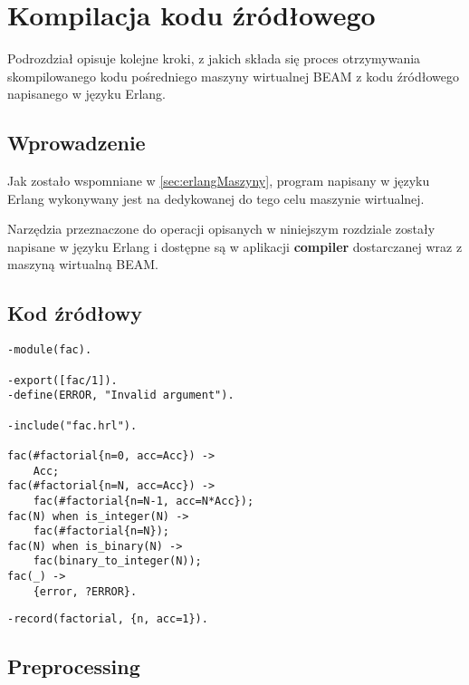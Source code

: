 \chapter{Kompilacja kodu źródłowego}
\label{cha:erlangKompilacja}

Podrozdział opisuje kolejne kroki, z jakich składa się proces otrzymywania skompilowanego kodu pośredniego maszyny wirtualnej BEAM z kodu źródłowego napisanego w języku Erlang.

\section{Wprowadzenie}

Jak zostało wspomniane w \ref{sec:erlangMaszyny}, program napisany w języku Erlang wykonywany jest na dedykowanej do tego celu maszynie wirtualnej.

Narzędzia przeznaczone do operacji opisanych w niniejszym rozdziale zostały napisane w języku Erlang i dostępne są w aplikacji \textbf{compiler} dostarczanej wraz z maszyną wirtualną BEAM.
\section{Kod źródłowy}

\begin{lstlisting}[style=erlang, caption=Plik fac.erl, label=facERL]
-module(fac).

-export([fac/1]).
-define(ERROR, "Invalid argument").

-include("fac.hrl").

fac(#factorial{n=0, acc=Acc}) ->
    Acc;
fac(#factorial{n=N, acc=Acc}) ->
    fac(#factorial{n=N-1, acc=N*Acc});
fac(N) when is_integer(N) ->
    fac(#factorial{n=N});
fac(N) when is_binary(N) ->
    fac(binary_to_integer(N));
fac(_) ->
    {error, ?ERROR}.
\end{lstlisting}

\begin{lstlisting}[style=erlang, caption=Plik fac.hrl, label=facHRL]
-record(factorial, {n, acc=1}).
\end{lstlisting}

\section{Preprocessing}

